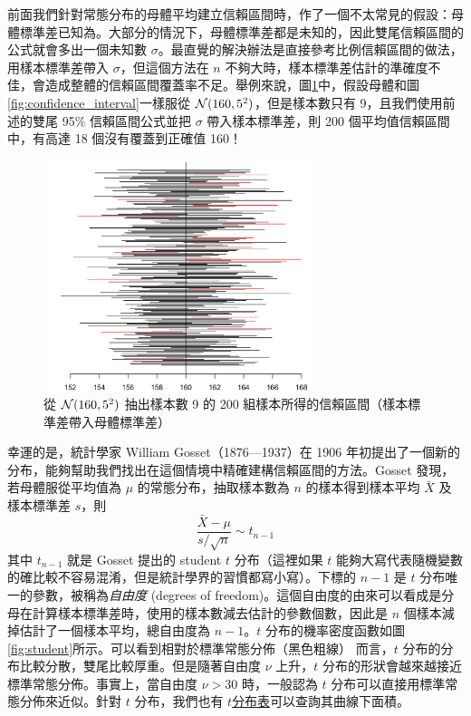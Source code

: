     \bigskip

    前面我們針對常態分布的母體平均建立信賴區間時，作了一個不太常見的假設：母體標準差已知為。大部分的情況下，母體標準差都是未知的，因此雙尾信賴區間的公式就會多出一個未知數 $\sigma$。最直覺的解決辦法是直接參考比例信賴區間的做法，用樣本標準差帶入 $\sigma$，但這個方法在 $n$ 不夠大時，樣本標準差估計的準確度不佳，會造成整體的信賴區間覆蓋率不足。舉例來說，圖\ref{fig:confidence_t}中，假設母體和圖\ref{fig:confidence_interval}一樣服從 $\mathcal{N}(160, 5^2)$，但是樣本數只有 9，且我們使用前述的雙尾 95\% 信賴區間公式並把 $\sigma$ 帶入樣本標準差，則 200 個平均值信賴區間中，有高達 18 個沒有覆蓋到正確值 160！

    \begin{figure}[htbp]
        \centering
        \includegraphics[width=0.7\textwidth]{figures/05-Confidence_interval/confidence_t.png}
        \caption{從 $\mathcal{N}(160, 5^2)$ 抽出樣本數 9 的 200 組樣本所得的信賴區間（樣本標準差帶入母體標準差）}
        \label{fig:confidence_t}
    \end{figure}

    幸運的是，統計學家 William Gosset（1876—1937）在 1906 年初提出了一個新的分布，能夠幫助我們找出在這個情境中精確建構信賴區間的方法。Gosset 發現，若母體服從平均值為 $\mu$ 的常態分布，抽取樣本數為 $n$ 的樣本得到樣本平均 $\bar{X}$ 及樣本標準差 $s$，則
    \[\frac{\bar{X}-\mu}{s/\sqrt{n}} \sim t_{n-1}\]
    其中 $t_{n-1}$ 就是 Gosset 提出的 student $t$ 分布（這裡如果 $t$ 能夠大寫代表隨機變數的確比較不容易混淆，但是統計學界的習慣都寫小寫）。下標的 $n-1$ 是 $t$ 分布唯一的參數，被稱為\textit{自由度} (degrees of freedom)。這個自由度的由來可以看成是分母在計算樣本標準差時，使用的樣本數減去估計的參數個數，因此是 $n$ 個樣本減掉估計了一個樣本平均，總自由度為 $n-1$。$t$ 分布的機率密度函數如圖\ref{fig:student}所示。可以看到相對於標準常態分佈（黑色粗線） 而言，$t$ 分布的分布比較分散，雙尾比較厚重。但是隨著自由度 $\nu$ 上升，$t$ 分布的形狀會越來越接近標準常態分佈。事實上，當自由度 $\nu > 30$ 時，一般認為 $t$ 分布可以直接用標準常態分佈來近似。針對 $t$ 分布，我們也有 \href{https://en.wikipedia.org/wiki/Student%27s_t-distribution}{$t$分布表}可以查詢其曲線下面積。

